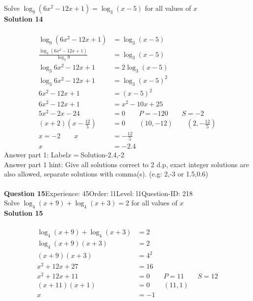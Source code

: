 \documentclass{article}
\begin{document}
Solve $\log_{9}(6x^2-12x+1)=\log_{3}(x-5)$ for all values of $x$\\[4pt]
\noindent\textbf{Solution 14}\\[2pt]
\\[-35pt]\begin{align*}
\log_{9}(6x^2-12x+1)&=\log_{3}(x-5)\\[2pt]
\displaystyle\frac{\log_{3}(6x^2-12x+1)}{\log_{3}9}&=\log_{3}(x-5)\\[2pt]
\log_{3}6x^2-12x+1&=2\log_{3}(x-5)\\[2pt]
\log_{3}6x^2-12x+1&=\log_{3}(x-5)^2\\[2pt]
6x^2-12x+1&=(x-5)^2\\[2pt]
6x^2-12x+1&=x^2-10x+25\\[2pt]
5x^2-2x-24&=0\qquad P=-120 \qquad S=-2\\[2pt]
(x+2)\left(x-\displaystyle\frac{12}{5}\right)&=0\qquad (10,-12) \qquad \left(2,-\displaystyle\frac{12}{5}\right)\\[2pt]
x=-2\qquad x&=-\displaystyle\frac{12}{5}\\[2pt]
x&=-2.4
\end{align*}
Answer part 1: \hspace{10pt}Label\hspace{10pt}$x=$\hspace{10pt}Solution\hspace{10pt}-2.4,-2\\
Answer part 1 hint: \hspace{15pt} Give all solutions correct to 2 d.p, exact integer solutions are also allowed, separate solutions with comma(s). (e.g: 2,-3 or 1.5,0.6)\\
\\[4pt]
\noindent\textbf{Question 15}\hspace{20pt}Experience: 45\hspace{20pt}Order: l1\hspace{20pt}Level: l1\hspace{20pt}Question-ID: 218\\[2pt]
Solve $\log_{4}(x+9)+\log_{4}(x+3)=2$ for all values of $x$\\[4pt]
\noindent\textbf{Solution 15}\\[2pt]
\\[-35pt]\begin{align*}
\log_{4}(x+9)+\log_{4}(x+3)&=2\\[2pt]
\log_{4}(x+9)(x+3)&=2\\[2pt]
(x+9)(x+3)&=4^2\\[2pt]
x^2+12x+27&=16\\[2pt]
x^2+12x+11&=0\qquad P=11 \qquad S=12\\[2pt]
(x+11)(x+1)&=0\qquad (11,1)\\[2pt]
x&=-1
\end{align*}
\end{document}

